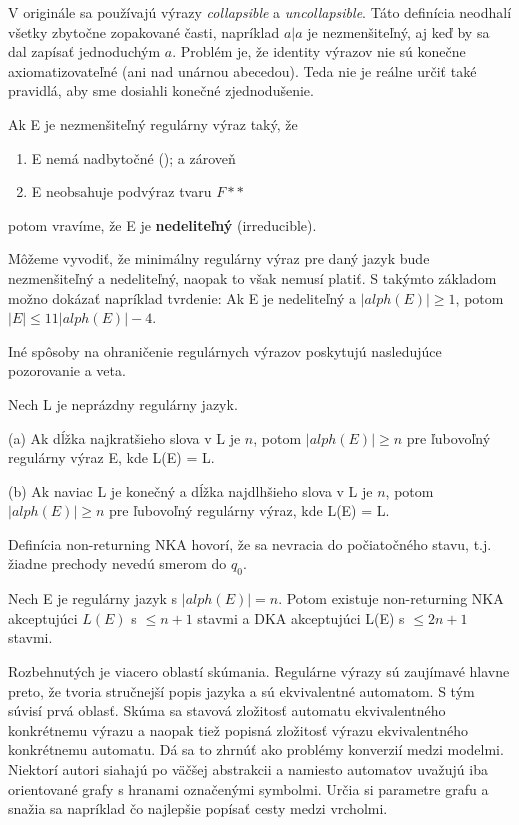 V originále sa používajú výrazy \textit{collapsible} a \textit{uncollapsible}. Táto definícia neodhalí všetky zbytočne zopakované časti, napríklad $a|a$ je nezmenšiteľný, aj keď by sa dal zapísať jednoduchým $a$. Problém je, že identity výrazov nie sú konečne axiomatizovateľné (ani nad unárnou abecedou). Teda nie je reálne určiť také pravidlá, aby sme dosiahli konečné zjednodušenie. \cite{newResults}

\begin{df}
Ak E je nezmenšiteľný regulárny výraz taký, že
\begin{enumerate}
\item E nemá nadbytočné (); a zároveň
\item E neobsahuje podvýraz tvaru $F**$
\end{enumerate}
potom vravíme, že E je \textbf{nedeliteľný} (irreducible).
\end{df}

Môžeme vyvodiť, že minimálny regulárny výraz pre daný jazyk bude nezmenšiteľný a nedeliteľný, naopak to však nemusí platiť. S takýmto základom možno dokázať napríklad tvrdenie: Ak E je nedeliteľný a $|alph(E)| \geq 1$, potom $|E| \leq 11|alph(E)| - 4$.

Iné spôsoby na ohraničenie regulárnych výrazov poskytujú nasledujúce pozorovanie a veta.

\begin{veta}
Nech L je neprázdny regulárny jazyk.

(a) Ak dĺžka najkratšieho slova v L je $n$, potom $|alph(E)| \geq n$ pre ľubovoľný regulárny výraz E, kde L(E) = L.

(b) Ak naviac L je konečný a dĺžka najdlhšieho slova v L je $n$, potom $|alph(E)| \geq n$ pre ľubovoľný regulárny výraz, kde L(E) = L.
\end{veta}

Definícia non-returning NKA hovorí, že sa nevracia do počiatočného stavu, t.j. žiadne prechody nevedú smerom do $q_0$.

\begin{veta}[Theorem 10]
Nech E je regulárny jazyk s $|alph(E)| = n$. Potom existuje non-returning NKA akceptujúci $L(E)$ s $\leq n+1$ stavmi a DKA akceptujúci L(E) s $\leq 2n+1$ stavmi.
\end{veta}

Rozbehnutých je viacero oblastí skúmania. Regulárne výrazy sú zaujímavé hlavne preto, že tvoria stručnejší popis jazyka a sú ekvivalentné automatom. S tým súvisí prvá oblasť. Skúma sa stavová zložitosť automatu ekvivalentného konkrétnemu výrazu a naopak tiež popisná zložitosť výrazu ekvivalentného konkrétnemu automatu. Dá sa to zhrnúť ako problémy konverzií medzi modelmi. Niektorí autori siahajú po väčšej abstrakcii a namiesto automatov uvažujú iba orientované grafy s hranami označenými symbolmi. Určia si parametre grafu a snažia sa napríklad čo najlepšie popísať cesty medzi vrcholmi.


